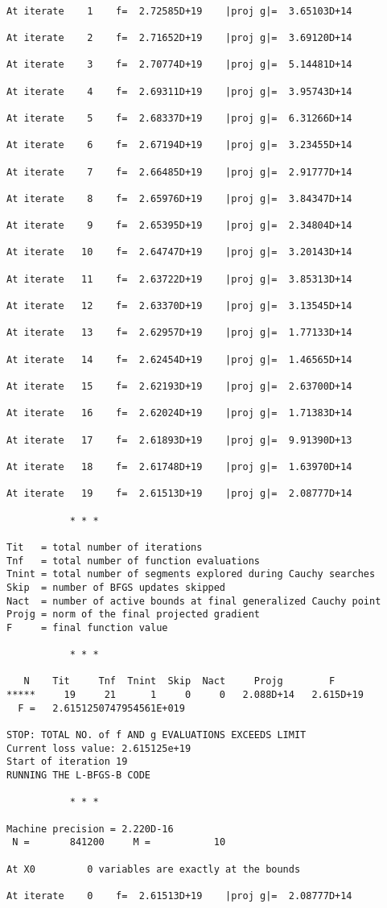\documentclass[11pt]{article}
\begin{document}
    \begin{Verbatim}[commandchars=\\\{\}]

At iterate    1    f=  2.72585D+19    |proj g|=  3.65103D+14

At iterate    2    f=  2.71652D+19    |proj g|=  3.69120D+14

At iterate    3    f=  2.70774D+19    |proj g|=  5.14481D+14

At iterate    4    f=  2.69311D+19    |proj g|=  3.95743D+14

At iterate    5    f=  2.68337D+19    |proj g|=  6.31266D+14

At iterate    6    f=  2.67194D+19    |proj g|=  3.23455D+14

At iterate    7    f=  2.66485D+19    |proj g|=  2.91777D+14

At iterate    8    f=  2.65976D+19    |proj g|=  3.84347D+14

At iterate    9    f=  2.65395D+19    |proj g|=  2.34804D+14

At iterate   10    f=  2.64747D+19    |proj g|=  3.20143D+14

At iterate   11    f=  2.63722D+19    |proj g|=  3.85313D+14

At iterate   12    f=  2.63370D+19    |proj g|=  3.13545D+14

At iterate   13    f=  2.62957D+19    |proj g|=  1.77133D+14

At iterate   14    f=  2.62454D+19    |proj g|=  1.46565D+14

At iterate   15    f=  2.62193D+19    |proj g|=  2.63700D+14

At iterate   16    f=  2.62024D+19    |proj g|=  1.71383D+14

At iterate   17    f=  2.61893D+19    |proj g|=  9.91390D+13

At iterate   18    f=  2.61748D+19    |proj g|=  1.63970D+14

At iterate   19    f=  2.61513D+19    |proj g|=  2.08777D+14

           * * *

Tit   = total number of iterations
Tnf   = total number of function evaluations
Tnint = total number of segments explored during Cauchy searches
Skip  = number of BFGS updates skipped
Nact  = number of active bounds at final generalized Cauchy point
Projg = norm of the final projected gradient
F     = final function value

           * * *

   N    Tit     Tnf  Tnint  Skip  Nact     Projg        F
*****     19     21      1     0     0   2.088D+14   2.615D+19
  F =   2.6151250747954561E+019

STOP: TOTAL NO. of f AND g EVALUATIONS EXCEEDS LIMIT
Current loss value: 2.615125e+19
Start of iteration 19
RUNNING THE L-BFGS-B CODE

           * * *

Machine precision = 2.220D-16
 N =       841200     M =           10

At X0         0 variables are exactly at the bounds

At iterate    0    f=  2.61513D+19    |proj g|=  2.08777D+14
    \end{Verbatim}
\end{document}
